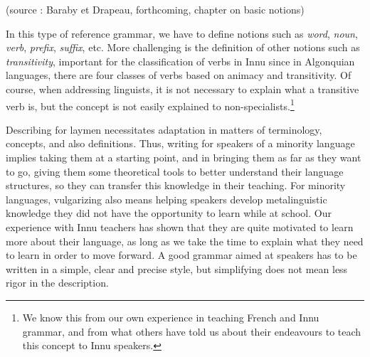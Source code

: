 \documentclass[letterpaper]{article}
\begin{document}
(source : Baraby et Drapeau, forthcoming, chapter on basic notions)

In this type of reference grammar, we have to define notions such as \textit{word}, \textit{noun}, \textit{verb}, \textit{prefix}, \textit{suffix}, etc. More challenging is the definition of other notions such as \textit{transitivity}, important for the classification of verbs in Innu since in Algonquian languages, there are four classes of verbs based on animacy and transitivity. Of course, when addressing linguists, it is not necessary to explain what a transitive verb is, but the concept is not easily explained to non-specialists.\footnote{ We know this from our own experience in teaching French and Innu grammar, and from what others have told us about their endeavours to teach this concept to Innu speakers.}

Describing for laymen necessitates adaptation in matters of terminology, concepts, and also definitions. Thus, writing for speakers of a minority language implies taking them at a starting point, and in bringing them as far as they want to go, giving them some theoretical tools to better understand their language structures, so they can transfer this knowledge in their teaching. For minority languages, vulgarizing also means helping speakers develop metalinguistic knowledge they did not have the opportunity to learn while at school. Our experience with Innu teachers has shown that they are quite motivated to learn more about their language, as long as we take the time to explain what they need to learn in order to move forward. A good grammar aimed at speakers has to be written in a simple, clear and precise style, but simplifying does not mean less rigor in the description. 
\end{document}
